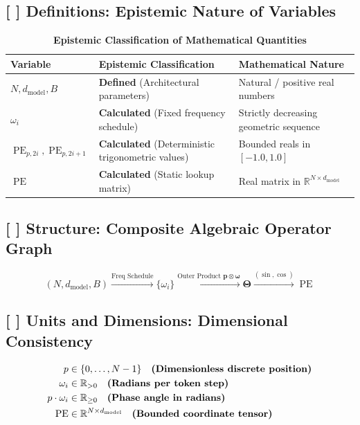 \documentclass[11pt,a4paper]{article}
\theoremstyle{definition}
\begin{document}
\subsection{[ ] Definitions: Epistemic Nature of Variables}
\begin{table}[h]
\centering
\caption{\textbf{Epistemic Classification of Mathematical Quantities}}
\begin{tabular}{lll}
\toprule
\textbf{Variable} & \textbf{Epistemic Classification} & \textbf{Mathematical Nature} \\
\midrule
$N, d_{\text{model}}, B$ & \textbf{Defined} (Architectural parameters) & Natural / positive real numbers \\
$\omega_i$ & \textbf{Calculated} (Fixed frequency schedule) & Strictly decreasing geometric sequence \\
$\operatorname{PE}_{p, 2i}, \operatorname{PE}_{p, 2i+1}$ & \textbf{Calculated} (Deterministic trigonometric values) & Bounded reals in $[-1.0, 1.0]$ \\
$\operatorname{PE}$ & \textbf{Calculated} (Static lookup matrix) & Real matrix in $\mathbb{R}^{N \times d_{\text{model}}}$ \\
\bottomrule
\end{tabular}
\end{table}

\subsection{[ ] Structure: Composite Algebraic Operator Graph}
{\boldmath
\begin{equation}
(N, d_{\text{model}}, B) \xrightarrow{\text{Freq Schedule}} \{\omega_i\} \xrightarrow{\text{Outer Product } \mathbf{p} \otimes \boldsymbol{\omega}} \mathbf{\Theta} \xrightarrow{(\sin, \cos)} \operatorname{PE}
\end{equation}
}

\subsection{[ ] Units and Dimensions: Dimensional Consistency}
{\boldmath
\begin{align}
p &\in \{0, \dots, N-1\} \quad \text{\textbf{(Dimensionless discrete position)}} \\
\omega_i &\in \mathbb{R}_{> 0} \quad \text{\textbf{(Radians per token step)}} \\
p \cdot \omega_i &\in \mathbb{R}_{\ge 0} \quad \text{\textbf{(Phase angle in radians)}} \\
\operatorname{PE} &\in \mathbb{R}^{N \times d_{\text{model}}} \quad \text{\textbf{(Bounded coordinate tensor)}}
\end{align}
}
\end{document}
